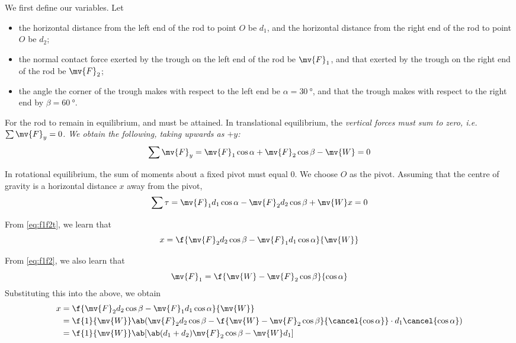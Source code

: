 We first define our variables. Let
\begin{itemize}
  \item the horizontal distance from the left end of the rod to point
    \(O\) be \(d_1\), and the horizontal distance from the right end
    of the rod to point \(O\) be \(d_2\);
  \item the normal contact force exerted by the trough on the left
    end of the rod be \(\mv{F}_1\), and
    that exerted by the trough on the right end of the rod be \(\mv{F}_2\);
  \item the angle the corner of the trough makes with respect to the
    left end be \(\alpha=\qty{30}{\degree}\),
    and that the trough makes with respect to the right end by
    \(\beta=\qty{60}{\degree}\).
\end{itemize}

For the rod to remain in equilibrium, 
and 
must be attained. In translational equilibrium, the \it{vertical}
forces must sum to
zero, i.e. \(\sum\mv{F}_y = 0\).
We obtain the following, taking upwards as \(+y\):
\begin{equation}
  \sum\mv{F}_y = \mv{F}_1\cos\alpha + \mv{F}_2\cos\beta - \mv{W} = 0
  \label{eq:f1f2}
\end{equation}

In rotational equilibrium, the sum of moments about a fixed pivot
must equal \(0\).
We choose \(O\) as the pivot.
Assuming that the centre of gravity is a horizontal distance \(x\)
away from the pivot,
\begin{equation}
  \sum\tau =\mv{F}_1d_1\cos\alpha - \mv{F}_2d_2\cos\beta + \mv{W}x = 0
  \label{eq:f1f2t}
\end{equation}

From \cref{eq:f1f2t}, we learn that
\begin{equation*}
  x = \f{\mv{F}_2d_2\cos\beta - \mv{F}_1d_1\cos\alpha}{\mv{W}}
\end{equation*}

From \cref{eq:f1f2}, we also learn that
\begin{equation*}
  \mv{F}_1 = \f{\mv{W} - \mv{F}_2\cos\beta}{\cos\alpha}
\end{equation*}
Substituting this into the above, we obtain
\begin{align*}
  x &= \f{\mv{F}_2d_2\cos\beta - \mv{F}_1d_1\cos\alpha}{\mv{W}} \\
  &= \f{1}{\mv{W}} \ab(\mv{F}_2d_2\cos\beta -
    \f{\mv{W}-\mv{F}_2\cos\beta}{\cancel{\cos\alpha}}\cdot
  d_1\cancel{\cos\alpha}) \\
  &= \f{1}{\mv{W}} \ab[\ab(d_1+d_2)\mv{F}_2\cos\beta - \mv{W}d_1]
\end{align*}

